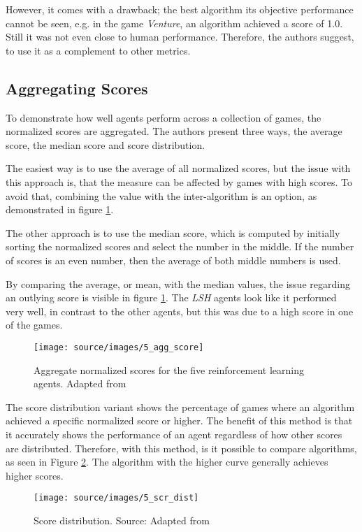 However, it comes with a drawback; the best algorithm its objective performance cannot be seen, e.g. in the game \textit{Venture}, an algorithm achieved a score of 1.0. Still it was not even close to human performance. Therefore, the authors suggest, to use it as a complement to other metrics.

\subsection{Aggregating Scores}
To demonstrate how well agents perform across a collection of games, the normalized scores are aggregated. The authors present three ways, the average score, the median score and score distribution. 

The easiest way is to use the average of all normalized scores, but the issue with this approach is, that the measure can be affected by games with high scores. To avoid that, combining the value with the inter-algorithm is an option, as demonstrated in figure \ref{fig:5_agg_score}. 

The other approach is to use the median score, which is computed by initially sorting the normalized scores and select the number in the middle. If the number of scores is an even number, then the average of both middle numbers is used. 

By comparing the average, or mean, with the median values, the issue regarding an outlying score is visible in figure \ref{fig:5_agg_score}. The \textit{LSH} agents look like it performed very well, in contrast to the other agents, but this was due to a high score in one of the games.
\begin{figure}[H]%
\centering
\texttt{[image: source/images/5\_agg\_score]}%
\caption[Aggregation of normalized scores]{Aggregate normalized scores for the five reinforcement learning agents. Adapted from \protect\cite{2012arXiv1207.4708B}}%
\label{fig:5_agg_score}%
\end{figure}
The score distribution variant shows the percentage of games where an algorithm achieved a specific normalized score or higher. The benefit of this method is that it accurately shows the performance of an agent regardless of how other scores are distributed. Therefore, with this method, is it possible to compare algorithms, as seen in Figure \ref{fig:5_scr_dist}. The algorithm with the higher curve generally achieves higher scores.
\begin{figure}[H]%
\centering
\texttt{[image: source/images/5\_scr\_dist]}%
\caption{Score distribution. Source: Adapted from \protect\cite{2012arXiv1207.4708B}}
\label{fig:5_scr_dist}%
\end{figure}


